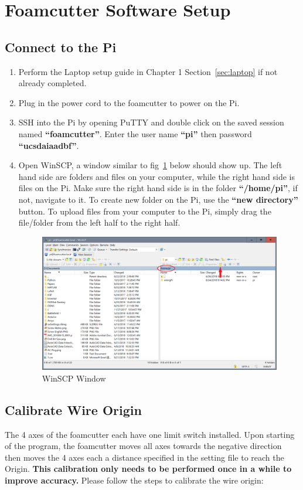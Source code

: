 \documentclass[titlepage,12pt,letter]{report}
\numberwithin{equation}{chapter}
\begin{document}
\section{Foamcutter Software Setup}
\subsection{Connect to the Pi}
\begin{enumerate}[noitemsep,topsep=0pt]
	\item Perform the Laptop setup guide in Chapter 1 Section~\ref{sec:laptop} if not already completed.
	\item Plug in the power cord to the foamcutter to power on the Pi.
	\item SSH into the Pi by opening PuTTY and double click on the saved session named \textbf{``foamcutter''}. Enter the user name \textbf{``pi''} then password \textbf{``ucsdaiaadbf''}.
	\item Open WinSCP, a window similar to fig~\ref{fig:winscp} below should show up. The left hand side are folders and files on your computer, while the right hand side is files on the Pi. Make sure the right hand side is in the folder \textbf{``/home/pi''}, if not, navigate to it. To create new folder on the Pi, use the \textbf{``new directory''} button. To upload files from your computer to the Pi, simply drag the file/folder from the left half to the right half. 
	\begin{figure} [H]
		\includegraphics[width = 0.9\linewidth]{./Figures/winscp.png}
		\caption{WinSCP Window}
		\label{fig:winscp}
	\end{figure}
\end{enumerate}

\subsection{Calibrate Wire Origin}
\label{sec:calibration}
The 4 axes of the foamcutter each have one limit switch installed. Upon starting of the program, the foamcutter moves all axes towards the negative direction then moves the 4 axes each a distance specified in the setting file to reach the Origin. \textbf{This calibration only needs to be performed once in a while to improve accuracy.} Please follow the  steps to calibrate the wire origin:
\end{document}
